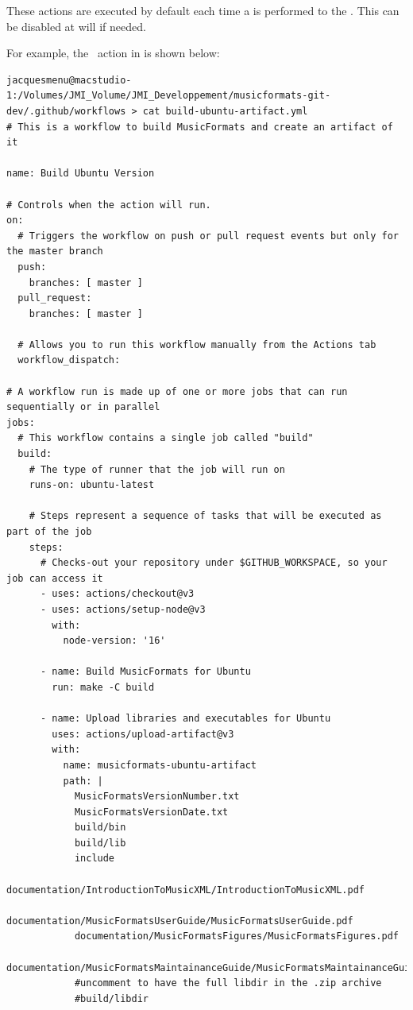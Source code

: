 These actions are executed by default each time a  is performed to the \masterBranch. This can be disabled at will if needed.

For example, the \Ubuntu\ action in  is shown below:
\begin{lstlisting}[language=Terminal]
jacquesmenu@macstudio-1:/Volumes/JMI_Volume/JMI_Developpement/musicformats-git-dev/.github/workflows > cat build-ubuntu-artifact.yml
# This is a workflow to build MusicFormats and create an artifact of it

name: Build Ubuntu Version

# Controls when the action will run.
on:
  # Triggers the workflow on push or pull request events but only for the master branch
  push:
    branches: [ master ]
  pull_request:
    branches: [ master ]

  # Allows you to run this workflow manually from the Actions tab
  workflow_dispatch:

# A workflow run is made up of one or more jobs that can run sequentially or in parallel
jobs:
  # This workflow contains a single job called "build"
  build:
    # The type of runner that the job will run on
    runs-on: ubuntu-latest

    # Steps represent a sequence of tasks that will be executed as part of the job
    steps:
      # Checks-out your repository under $GITHUB_WORKSPACE, so your job can access it
      - uses: actions/checkout@v3
      - uses: actions/setup-node@v3
        with:
          node-version: '16'

      - name: Build MusicFormats for Ubuntu
        run: make -C build

      - name: Upload libraries and executables for Ubuntu
        uses: actions/upload-artifact@v3
        with:
          name: musicformats-ubuntu-artifact
          path: |
            MusicFormatsVersionNumber.txt
            MusicFormatsVersionDate.txt
            build/bin
            build/lib
            include
            documentation/IntroductionToMusicXML/IntroductionToMusicXML.pdf
            documentation/MusicFormatsUserGuide/MusicFormatsUserGuide.pdf
            documentation/MusicFormatsFigures/MusicFormatsFigures.pdf
            documentation/MusicFormatsMaintainanceGuide/MusicFormatsMaintainanceGuide.pdf
            #uncomment to have the full libdir in the .zip archive
            #build/libdir
\end{lstlisting}

